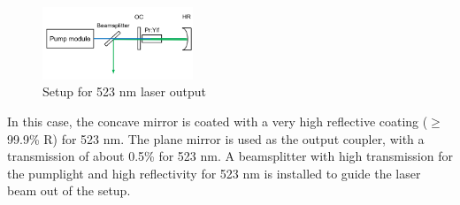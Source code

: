 \documentclass[conference]{IEEEtran}
\begin{document}
\begin{figure}[h]
	\centering
	\includegraphics[width=0.4\textwidth]{img/setup523}
	\caption{Setup for 523 nm laser output}
	\label{setup523}
\end{figure}
In this case, the concave mirror is coated with a very high reflective coating ($\geq$ 99.9\% R) for 523 nm. The plane mirror is used as the output coupler, with a transmission of about 0.5\% for 523 nm. A beamsplitter with high transmission for the pumplight and high reflectivity for 523 nm is installed to guide the laser beam out of the setup. 
\end{document}
